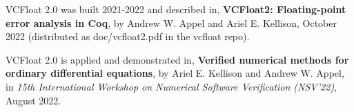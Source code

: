 \documentclass[article]{memoir}
\begin{document}
VCFloat 2.0 was built 2021-2022 and described in,\newline
\textbf{VCFloat2: Floating-point error analysis in Coq},
by Andrew W. Appel and Ariel E. Kellison,
October 2022  (distributed as doc/vcfloat2.pdf in the vcfloat repo).
\vspace\baselineskip

VCFloat 2.0 is applied and demonstrated in,\newline
\textbf{Verified numerical methods for ordinary differential equations},
by Ariel E. Kellison and Andrew W. Appel,
in \emph{15th International Workshop on Numerical Software Verification (NSV'22)}, August 2022.
\end{document}
